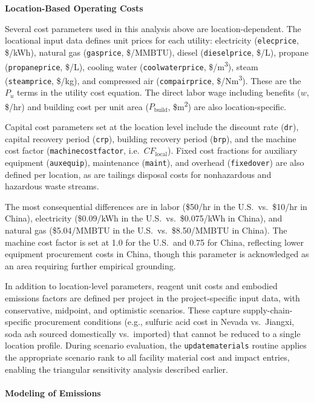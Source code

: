 \documentclass{article}
\renewcommand\_{\textunderscore\allowbreak}
\begin{document}
\medskip
\noindent\textbf{Location-Based Operating Costs}\quad

Several cost parameters used in this analysis above are location-dependent. The locational input data defines unit prices for each utility: electricity (\texttt{elec\_price}, \$/kWh), natural gas (\texttt{gas\_price}, \$/MMBTU), diesel (\texttt{diesel\_price}, \$/L), propane (\texttt{propane\_price}, \$/L), cooling water (\texttt{cool\_water\_price}, \$/\si{m^3}), steam (\texttt{steam\_price}, \$/kg), and compressed air (\texttt{comp\_air\_price}, \$/\si{Nm^3}). These are the $P_u$ terms in the utility cost equation. The direct labor wage including benefits ($w$, \$/hr) and building cost per unit area ($P_{\text{build}}$, \$\si{m^2}) are also location-specific.

Capital cost parameters set at the location level include the discount rate (\texttt{dr}), capital recovery period (\texttt{crp}), building recovery period (\texttt{brp}), and the machine cost factor (\texttt{machine\_cost\_factor}, i.e.\ $CF_{\text{local}}$). Fixed cost fractions for auxiliary equipment (\texttt{aux\_equip}), maintenance (\texttt{maint}), and overhead (\texttt{fixed\_over}) are also defined per location, as are tailings disposal costs for nonhazardous and hazardous waste streams.

The most consequential differences are in labor (\$50/hr in the U.S.\ vs.\ \$10/hr in China), electricity (\$0.09/kWh in the U.S.\ vs.\ \$0.075/kWh in China), and natural gas (\$5.04/MMBTU in the U.S.\ vs.\ \$8.50/MMBTU in China). The machine cost factor is set at 1.0 for the U.S.\ and 0.75 for China, reflecting lower equipment procurement costs in China, though this parameter is acknowledged as an area requiring further empirical grounding.

In addition to location-level parameters, reagent unit costs and embodied emissions factors are defined per project in the project-specific input data, with conservative, midpoint, and optimistic scenarios. These capture supply-chain-specific procurement conditions (e.g., sulfuric acid cost in Nevada vs.\ Jiangxi, soda ash sourced domestically vs.\ imported) that cannot be reduced to a single location profile. During scenario evaluation, the \texttt{update\_materials} routine applies the appropriate scenario rank to all facility material cost and impact entries, enabling the triangular sensitivity analysis described earlier.

\paragraph{Modeling of Emissions}\label{app:04-methods-system-emissions}\leavevmode\par
\end{document}
